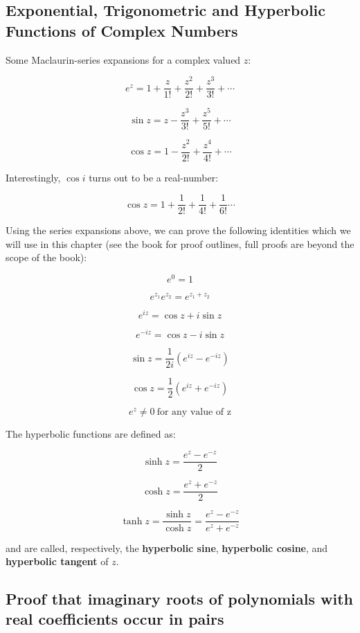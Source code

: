 \documentclass{article}
\begin{document}
\subsection{Exponential, Trigonometric and Hyperbolic Functions of Complex Numbers}

Some \@{Maclaurin-series} expansions for a complex valued $z$:

\[ e^z = 1 + \frac{z}{1!} + \frac{z^2}{2!} + \frac{z^3}{3!} + \cdots \tag{18.73} \]

\[ \sin{z} = z - \frac{z^3}{3!} + \frac{z^5}{5!} + \cdots \tag{18.74} \]

\[ \cos{z} = 1 - \frac{z^2}{2!} + \frac{z^4}{4!} + \cdots \tag{18.75} \]

Interestingly, $\cos{i}$ turns out to be a \@{real-number}:

\[ \cos{z} = 1 + \frac{1}{2!} + \frac{1}{4!} + \frac{1}{6!}\cdots \]

Using the series expansions above, we can prove the following identities which we will use in this chapter (see the book for proof outlines, full proofs are beyond the scope of the book):

\[ e^0 = 1 \tag{18.8} \]

\[ e^{z_1}e^{z_2} = e^{z_1+z_2} \tag{18.81} \]

\[ e^{iz} = \cos{z} + i\sin{z} \tag{18.82} \]

\[ e^{-iz} = \cos{z} - i\sin{z} \tag{18.83} \]

\[ \sin{z} = \frac{1}{2i}(e^{iz}-e^{-iz}) \tag{18.84} \]

\[ \cos{z} = \frac{1}{2}(e^{iz}+e^{-iz}) \tag{18.85} \]

\[ e^z \neq 0~\text{for any value of z}\tag{18.86} \]

The hyperbolic functions are defined as:

\[ \sinh{z} = \frac{e^z - e^{-z}}{2} \tag{18.9} \] 

\[ \cosh{z} = \frac{e^z + e^{-z}}{2} \tag{18.91} \] 

\[ \tanh{z} = \frac{\sinh{z}}{\cosh{z}} = \frac{e^z - e^{-z}}{e^z + e^{-z}} \tag{18.92} \] 

and are called, respectively, the \textbf{hyperbolic sine}, \textbf{hyperbolic cosine}, and \textbf{hyperbolic tangent} of $z$.

\subsection{Proof that imaginary roots of polynomials with real coefficients occur in pairs}
\end{document}
